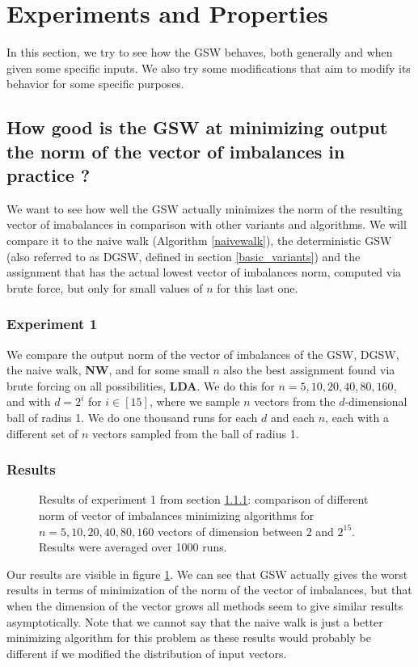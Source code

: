 \documentclass[12pt]{article}
\begin{document}
\section{Experiments and Properties}\label{exp_and_prop}
In this section, we try to see how the GSW behaves, both generally and when given some specific inputs. We also try some modifications that aim to modify its behavior for some specific purposes.

\subsection{How good is the GSW at minimizing output the norm of the vector of imbalances in practice ?}
We want to see how well the GSW actually minimizes the norm of the resulting vector of imabalances in comparison with other variants and algorithms. We will compare it to the naive walk (Algorithm \ref{naivewalk}), the deterministic GSW (also referred to as DGSW, defined in section \ref{basic_variants}) and the assignment that has the actual lowest vector of imbalances norm, computed via brute force, but only for small values of $n$ for this last one.

\subsubsection{Experiment 1}\label{how_good_at_minimizing_disc}
We compare the output norm of the vector of imbalances of the GSW, DGSW, the naive walk, \textbf{NW}, and for some small $n$ also the best assignment found via brute forcing on all possibilities, \textbf{LDA}. We do this for $n=5,10,20,40,80,160$, and with $d=2^i$ for $i\in[15]$, where we sample $n$ vectors from the $d$-dimensional ball of radius 1. We do one thousand runs for each $d$ and each $n$, each with a different set of $n$ vectors sampled from the ball of radius 1.

\subsubsection{Results}
\begin{figure}
\centering

\caption{Results of experiment 1 from section \ref{how_good_at_minimizing_disc}: comparison of different norm of vector of imbalances minimizing algorithms for $n=5,10,20,40,80,160$ vectors of dimension between $2$ and $2^{15}$. Results were averaged over 1000 runs.}\label{output_disc}
\end{figure}
Our results are visible in figure \ref{output_disc}. We can see that GSW actually gives the worst results in terms of minimization of the norm of the vector of imbalances, but that when the dimension of the vector grows all methods seem to give similar results asymptotically. Note that we cannot say that the naive walk is just a better minimizing algorithm for this problem as these results would probably be different if we modified the distribution of input vectors.
\end{document}
